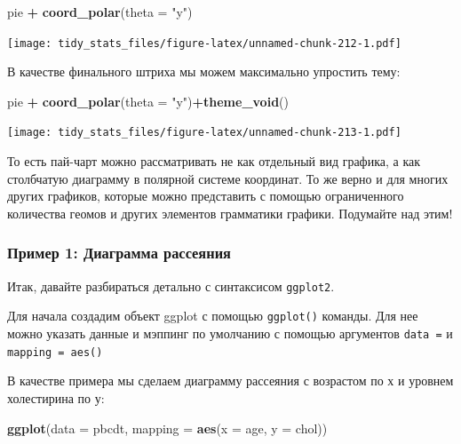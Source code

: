 \documentclass[]{book}
\newenvironment{Shaded}{\begin{snugshade}}{\end{snugshade}}
\newcommand{\KeywordTok}[1]{\textcolor[rgb]{0.13,0.29,0.53}{\textbf{#1}}}
\newcommand{\DataTypeTok}[1]{\textcolor[rgb]{0.13,0.29,0.53}{#1}}
\newcommand{\StringTok}[1]{\textcolor[rgb]{0.31,0.60,0.02}{#1}}
\newcommand{\OperatorTok}[1]{\textcolor[rgb]{0.81,0.36,0.00}{\textbf{#1}}}
\newcommand{\NormalTok}[1]{#1}
\begin{document}
\begin{Shaded}
\begin{Highlighting}[]
\NormalTok{pie }\OperatorTok{+}\StringTok{ }\KeywordTok{coord_polar}\NormalTok{(}\DataTypeTok{theta =} \StringTok{"y"}\NormalTok{)}
\end{Highlighting}
\end{Shaded}

\texttt{[image: tidy\_stats\_files/figure-latex/unnamed-chunk-212-1.pdf]}

В качестве финального штриха мы можем максимально упростить тему:

\begin{Shaded}
\begin{Highlighting}[]
\NormalTok{pie }\OperatorTok{+}\StringTok{ }\KeywordTok{coord_polar}\NormalTok{(}\DataTypeTok{theta =} \StringTok{"y"}\NormalTok{)}\OperatorTok{+}\KeywordTok{theme_void}\NormalTok{()}
\end{Highlighting}
\end{Shaded}

\texttt{[image: tidy\_stats\_files/figure-latex/unnamed-chunk-213-1.pdf]}

То есть пай-чарт можно рассматривать не как отдельный вид графика, а как
столбчатую диаграмму в полярной системе координат. То же верно и для
многих других графиков, которые можно представить с помощью
ограниченного количества геомов и других элементов грамматики графики.
Подумайте над этим!

\subsubsection{Пример 1: Диаграмма
рассеяния}\label{ux43fux440ux438ux43cux435ux440-1-ux434ux438ux430ux433ux440ux430ux43cux43cux430-ux440ux430ux441ux441ux435ux44fux43dux438ux44f}

Итак, давайте разбираться детально с синтаксисом \texttt{ggplot2}.

Для начала создадим объект ggplot с помощью \texttt{ggplot()} команды.
Для нее можно указать данные и мэппинг по умолчанию с помощью аргументов
\texttt{data\ =} и \texttt{mapping\ =\ aes()}

В качестве примера мы сделаем диаграмму рассеяния с возрастом по х и
уровнем холестирина по у:

\begin{Shaded}
\begin{Highlighting}[]
\KeywordTok{ggplot}\NormalTok{(}\DataTypeTok{data =}\NormalTok{ pbcdt, }\DataTypeTok{mapping =} \KeywordTok{aes}\NormalTok{(}\DataTypeTok{x =}\NormalTok{ age, }\DataTypeTok{y =}\NormalTok{ chol))}
\end{Highlighting}
\end{Shaded}
\end{document}

